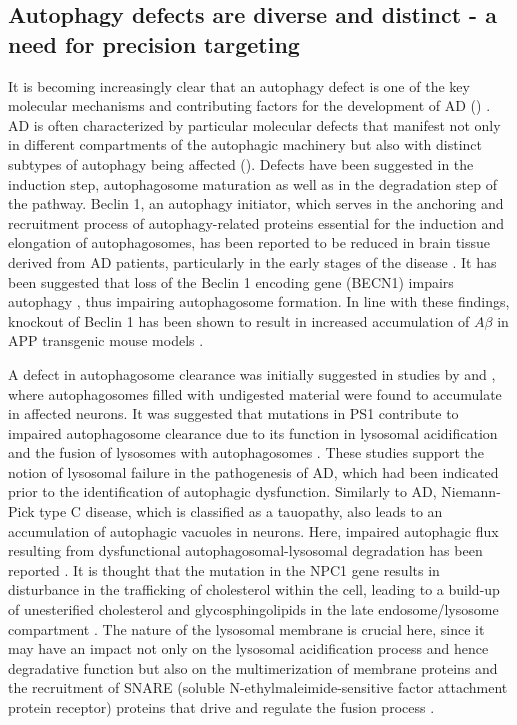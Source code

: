 \subsection{Autophagy defects are diverse and distinct - a need for precision targeting}
It is becoming increasingly clear that an autophagy defect is one of the key molecular mechanisms and contributing factors for the development of AD () \citep{Nixon2005,Nixon2011}. AD is often characterized by particular molecular defects that manifest not only in different compartments of the autophagic machinery but also with distinct subtypes of autophagy being affected (). Defects have been suggested in the induction step, autophagosome maturation as well as in the degradation step of the pathway. Beclin 1, an autophagy initiator, which serves in the anchoring and recruitment process of autophagy-related proteins essential for the induction and elongation of autophagosomes, has been reported to be reduced in brain tissue derived from AD patients, particularly in the early stages of the disease \citep{Pickford2008}. It has been suggested that loss of the Beclin 1 encoding gene (BECN1) impairs autophagy \citep{Frake2015,Pickford2008}, thus impairing autophagosome formation. In line with these findings, knockout of Beclin 1 has been shown to result in increased accumulation of $A\beta$ in APP transgenic mouse models \citep{Pickford2008}.

A defect in autophagosome clearance was initially suggested in studies by \citet{Nixon2005} and \citet{Boland2008}, where autophagosomes filled with undigested material were found to accumulate in affected neurons. It was suggested that mutations in PS1 contribute to impaired autophagosome clearance due to its function in lysosomal acidification and the fusion of lysosomes with autophagosomes \citep{Lee2010,Neely2011}. These studies support the notion of lysosomal failure in the pathogenesis of AD, which had been indicated prior to the identification of autophagic dysfunction. Similarly to AD, Niemann-Pick type C disease, which is classified as a tauopathy, also leads to an accumulation of autophagic vacuoles in neurons. Here, impaired autophagic flux resulting from dysfunctional autophagosomal-lysosomal degradation has been reported \citep{Elrick2012,German2001,Meske2016}. It is thought that the mutation in the NPC1 gene results in disturbance in the trafficking of cholesterol within the cell, leading to a build-up of unesterified cholesterol and glycosphingolipids in the late endosome/lysosome compartment \citep{Elrick2012,Meske2016,Nixon2004}. The nature of the lysosomal membrane is crucial here, since it may have an impact not only on the lysosomal acidification process and hence degradative function but also on the multimerization of membrane proteins and the recruitment of SNARE (soluble N-ethylmaleimide-sensitive factor attachment protein receptor) proteins that drive and regulate the fusion process \citep{Itakura2012}.

